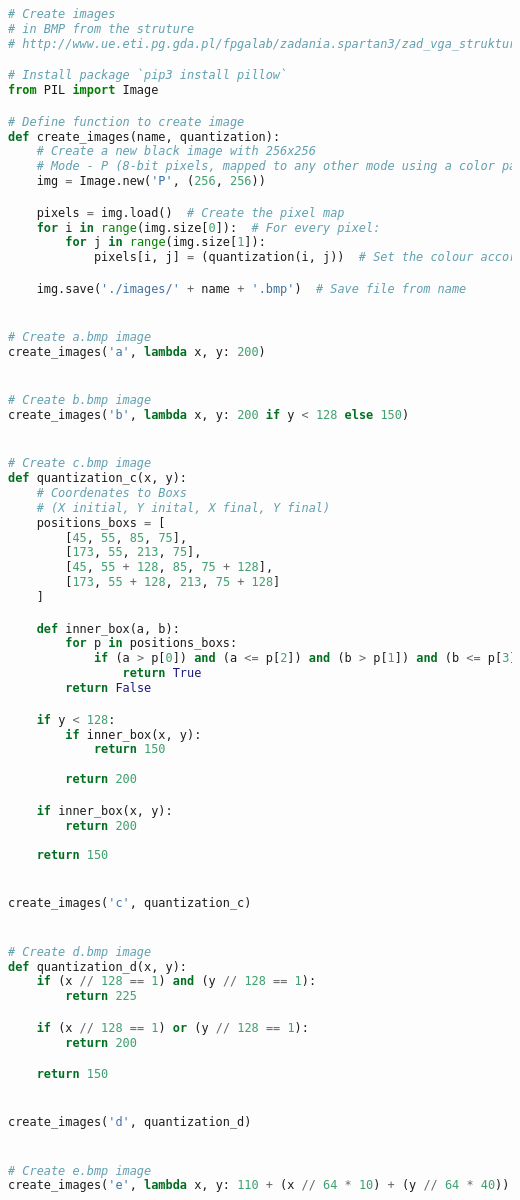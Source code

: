 \documentclass{article}
\begin{document}
\begin{lstlisting}[language=Python]
# Create images
# in BMP from the struture
# http://www.ue.eti.pg.gda.pl/fpgalab/zadania.spartan3/zad_vga_struktura_pliku_bmp_en.html

# Install package `pip3 install pillow`
from PIL import Image

# Define function to create image
def create_images(name, quantization):
    # Create a new black image with 256x256
    # Mode - P (8-bit pixels, mapped to any other mode using a color palette)
    img = Image.new('P', (256, 256))

    pixels = img.load()  # Create the pixel map
    for i in range(img.size[0]):  # For every pixel:
        for j in range(img.size[1]):
            pixels[i, j] = (quantization(i, j))  # Set the colour accordingly

    img.save('./images/' + name + '.bmp')  # Save file from name


# Create a.bmp image
create_images('a', lambda x, y: 200)


# Create b.bmp image
create_images('b', lambda x, y: 200 if y < 128 else 150)


# Create c.bmp image
def quantization_c(x, y):
    # Coordenates to Boxs
    # (X initial, Y inital, X final, Y final)
    positions_boxs = [
        [45, 55, 85, 75],
        [173, 55, 213, 75],
        [45, 55 + 128, 85, 75 + 128],
        [173, 55 + 128, 213, 75 + 128]
    ]

    def inner_box(a, b):
        for p in positions_boxs:
            if (a > p[0]) and (a <= p[2]) and (b > p[1]) and (b <= p[3]):
                return True
        return False

    if y < 128:
        if inner_box(x, y):
            return 150
        
        return 200

    if inner_box(x, y):
        return 200
    
    return 150


create_images('c', quantization_c)


# Create d.bmp image
def quantization_d(x, y):
    if (x // 128 == 1) and (y // 128 == 1):
        return 225

    if (x // 128 == 1) or (y // 128 == 1):
        return 200

    return 150


create_images('d', quantization_d)


# Create e.bmp image
create_images('e', lambda x, y: 110 + (x // 64 * 10) + (y // 64 * 40))
\end{lstlisting}
\end{document}
